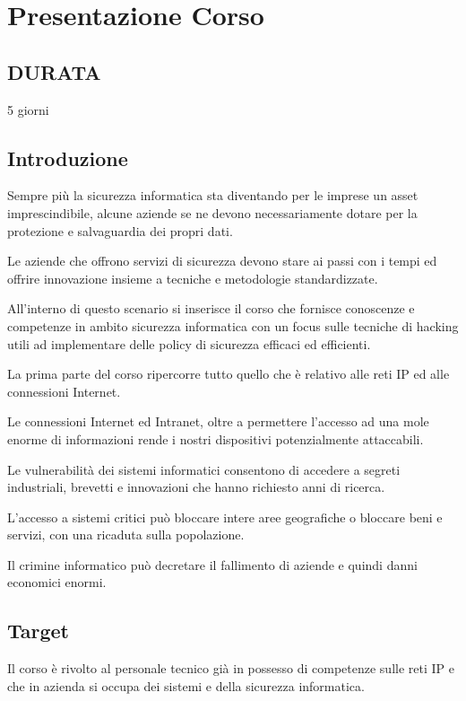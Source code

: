 \chapter{Presentazione Corso}


\section{DURATA}
 5 giorni
\section{Introduzione}

Sempre più la sicurezza informatica sta diventando per le imprese un asset imprescindibile, alcune aziende se ne devono necessariamente
dotare per la protezione e salvaguardia dei propri dati.

Le aziende che offrono servizi di sicurezza devono stare ai passi con i tempi ed offrire innovazione insieme a tecniche e metodologie standardizzate.

All’interno di questo scenario si inserisce il corso che fornisce conoscenze e competenze  in ambito sicurezza informatica con un focus sulle tecniche di hacking utili ad implementare delle policy
di sicurezza efficaci ed efficienti.

La prima parte del corso ripercorre tutto quello che è relativo alle reti IP ed alle connessioni Internet.

Le connessioni Internet ed Intranet, oltre a permettere l'accesso ad una mole enorme di informazioni
rende i nostri dispositivi potenzialmente attaccabili.

Le vulnerabilità dei sistemi informatici consentono di accedere a segreti industriali, brevetti e
innovazioni che hanno richiesto anni di ricerca.

L'accesso a sistemi critici può bloccare intere aree geografiche o bloccare beni e servizi, con una ricaduta sulla popolazione. 

Il crimine informatico può decretare il fallimento di aziende e quindi danni economici enormi.

\section{Target}
Il corso è rivolto al personale tecnico già in possesso di competenze sulle reti IP e che in azienda si
occupa dei sistemi e della sicurezza informatica.

